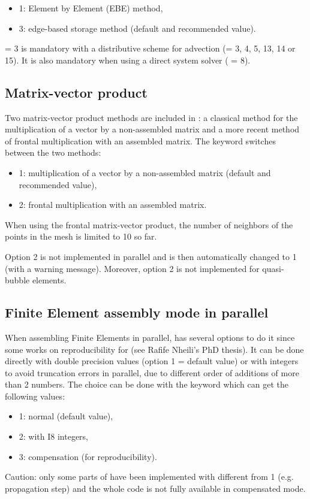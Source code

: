 \begin{itemize}
\item 1: Element by Element (EBE) method,

\item 3: edge-based storage method (default and recommended value).
\end{itemize}

 = 3 is mandatory with a distributive scheme
for advection (= 3, 4, 5, 13, 14 or 15).
It is also mandatory when using a direct system solver ( = 8).


\subsection{Matrix-vector product}

Two matrix-vector product methods are included in :
a classical method for the multiplication of a vector by a non-assembled matrix
and a more recent method of frontal multiplication with an assembled matrix.
The keyword  switches between the two methods:

\begin{itemize}
\item 1: multiplication of a vector by a non-assembled matrix
(default and recommended value),

\item 2: frontal multiplication with an assembled matrix.
\end{itemize}

When using the frontal matrix-vector product,
the number of neighbors of the points in the mesh is limited to 10 so far.

Option 2 is not implemented in parallel and is then automatically changed to 1
(with a warning message).
Moreover, option 2 is not implemented for quasi-bubble elements.


\subsection{Finite Element assembly mode in parallel}

When assembling Finite Elements in parallel,  has several options
to do it since some works on reproducibility for \tel
(see Rafife Nheili's PhD thesis).
It can be done directly with double precision values
(option 1 = default value)
or with integers to avoid truncation errors in parallel, due to different
order of additions of more than 2 numbers.
The choice can be done with the keyword 
which can get the following values:
\begin{itemize}
\item 1: normal (default value),
\item 2: with I8 integers,
\item 3: compensation (for reproducibility).
\end{itemize}
Caution: only some parts of  have been implemented
with  different from 1
(e.g. propagation step) and the whole code is not fully available
in compensated mode.


